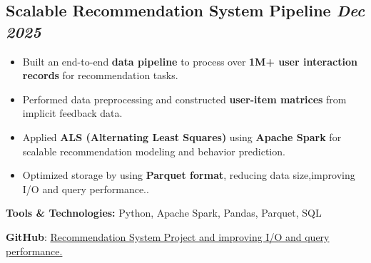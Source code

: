 \subsection*{Scalable Recommendation System Pipeline \hfill \textit{Dec 2025}}
\begin{itemize}
    \item Built an end-to-end \textbf{data pipeline} to process over \textbf{1M+ user interaction records} for recommendation tasks.
    \item Performed data preprocessing and constructed \textbf{user-item matrices} from implicit feedback data.
    \item Applied \textbf{ALS (Alternating Least Squares)} using \textbf{Apache Spark} for scalable recommendation modeling and behavior prediction.
    \item Optimized storage by using \textbf{Parquet format}, reducing data size,improving I/O and query performance..
\end{itemize}

\textbf{Tools \& Technologies:} Python, Apache Spark, Pandas, Parquet, SQL 

\textbf{GitHub}: \href{https://github.com/xuanduong2711/als_recommend}{Recommendation System Project and improving I/O and query performance.}